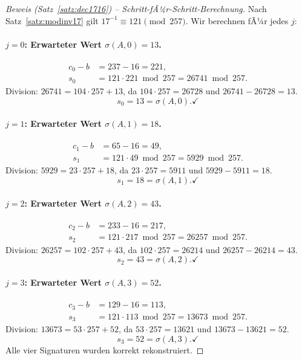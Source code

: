 ﻿\documentclass[a4paper,12pt]{scrreprt}
\theoremstyle{definition}
\begin{document}
\begin{proof}[Beweis (Satz~\ref{satz:dec1716}) -- Schritt-fÃ¼r-Schritt-Berechnung]
Nach Satz~\ref{satz:modinv17} gilt $17^{-1} \equiv 121 \pmod{257}$. Wir berechnen fÃ¼r jedes $j$:

\paragraph{$j = 0$: Erwarteter Wert $\sigma(A,0) = 13$.}
\begin{align*}
c_0 - b &= 237 - 16 = 221, \\
s_0 &= 121 \cdot 221 \bmod 257 = 26741 \bmod 257.
\end{align*}
Division: $26741 = 104 \cdot 257 + 13$, da $104 \cdot 257 = 26728$ und $26741 - 26728 = 13$.
\[
s_0 = 13 = \sigma(A,0). \checkmark
\]

\paragraph{$j = 1$: Erwarteter Wert $\sigma(A,1) = 18$.}
\begin{align*}
c_1 - b &= 65 - 16 = 49, \\
s_1 &= 121 \cdot 49 \bmod 257 = 5929 \bmod 257.
\end{align*}
Division: $5929 = 23 \cdot 257 + 18$, da $23 \cdot 257 = 5911$ und $5929 - 5911 = 18$.
\[
s_1 = 18 = \sigma(A,1). \checkmark
\]

\paragraph{$j = 2$: Erwarteter Wert $\sigma(A,2) = 43$.}
\begin{align*}
c_2 - b &= 233 - 16 = 217, \\
s_2 &= 121 \cdot 217 \bmod 257 = 26257 \bmod 257.
\end{align*}
Division: $26257 = 102 \cdot 257 + 43$, da $102 \cdot 257 = 26214$ und $26257 - 26214 = 43$.
\[
s_2 = 43 = \sigma(A,2). \checkmark
\]

\paragraph{$j = 3$: Erwarteter Wert $\sigma(A,3) = 52$.}
\begin{align*}
c_3 - b &= 129 - 16 = 113, \\
s_3 &= 121 \cdot 113 \bmod 257 = 13673 \bmod 257.
\end{align*}
Division: $13673 = 53 \cdot 257 + 52$, da $53 \cdot 257 = 13621$ und $13673 - 13621 = 52$.
\[
s_3 = 52 = \sigma(A,3). \checkmark
\]
Alle vier Signaturen wurden korrekt rekonstruiert.
\end{proof}
\end{document}
